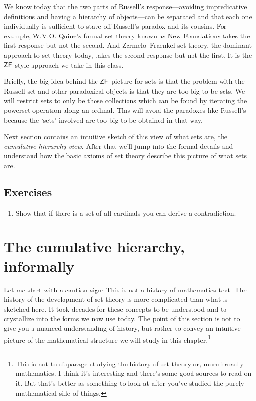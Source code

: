 \documentclass[10pt]{amsart}
\begin{document}
We know today that the two parts of Russell's response---avoiding impredicative definitions and having a hierarchy of objects---can be separated and that each one individually is sufficient to stave off Russell's paradox and its cousins.
For example, W.V.O. Quine's formal set theory known as New Foundations takes the first response but not the second. And Zermelo--Fraenkel set theory, the dominant approach to set theory today, takes the second response but not the first. It is the $\mathsf{ZF}$-style approach we take in this class.

Briefly, the big idea behind the $\mathsf{ZF}$ picture for sets is that the problem with the Russell set and other paradoxical objects is that they are too big to be sets. We will restrict sets to only be those collections which can be found by iterating the powerset operation along an ordinal. This will avoid the paradoxes like Russell's because the `sets' involved are too big to be obtained in that way. 

Next section contains an intuitive sketch of this view of what sets are, the \emph{cumulative hierarchy view}. After that we'll jump into the formal details and understand how the basic axioms of set theory describe this picture of what sets are.

\subsection*{Exercises}

\begin{enumerate}
\item Show that if there is a set of all cardinals you can derive a contradiction.
\end{enumerate}

\newpage

\section{The cumulative hierarchy, informally}

Let me start with a caution sign: This is not a history of mathematics text. The history of the development of set theory is more complicated than what is sketched here. It took decades for these concepts to be understood and to crystallize into the forms we now use today. The point of this section is not to give you a nuanced understanding of history, but rather to convey an intuitive picture of the mathematical structure we will study in this chapter.\footnote{This is not to disparage studying the history of set theory or, more broadly mathematics. I think it's interesting and there's some good sources to read on it. But that's better as something to look at after you've studied the purely mathematical side of things.}
\end{document}
